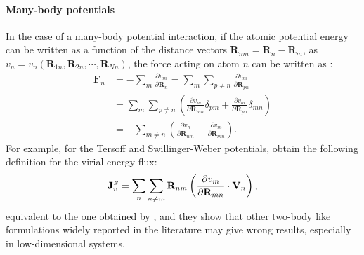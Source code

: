 \begin{LEtext}
\paragraph{Many-body potentials}
In the case of a many-body potential interaction, if the atomic potential energy can be written as a function of the distance vectors $\mathbf{R}_{nm}=\mathbf{R}_n-\mathbf{R}_m$, as $v_n = v_n(\mathbf{R}_{1n},\mathbf{R}_{2n},\cdots,\mathbf{R}_{Nn})$, the force acting on atom $n$ can be written as \cite{Fan2015,Hardy2016}:
\begin{align}
    \mathbf{F}_n &= -\sum_m \frac{\partial v_m}{\partial \mathbf{R}_n} = \sum_m \sum_{p\neq n} \frac{\partial v_m}{\partial \mathbf{R}_{pn}} \nonumber\\
        &= \sum_m \sum_{p\neq n} \left(\frac{\partial v_m}{\partial \mathbf{R}_{mn}} \delta_{pm} + \frac{\partial v_m}{\partial \mathbf{R}_{pn}} \delta_{mn} \right) \nonumber\\
        &= -\sum_{m\neq n} \left( \frac{\partial v_n}{\partial \mathbf{R}_{nm}} - \frac{\partial v_m}{\partial \mathbf{R}_{mn}} \right).
\end{align}
For example, for the Tersoff \cite{Tersoff1989} and Swillinger-Weber \cite{Stillinger1985} potentials, \citet{Fan2015} obtain the following definition for the virial energy flux:
\begin{equation}
    \mathbf{J}^{\scriptscriptstyle E}_v = \sum_n \sum_{n\neq m} \mathbf{R}_{nm} \left(\frac{\partial v_m}{\partial \mathbf{R}_{mn}} \cdot \mathbf{V}_n \right) ,
\end{equation}
equivalent to the one obtained by \citet{Hardy1963}, and they show that other two-body like formulations widely reported in the literature may give wrong results, especially in low-dimensional systems.

\end{LEtext}


